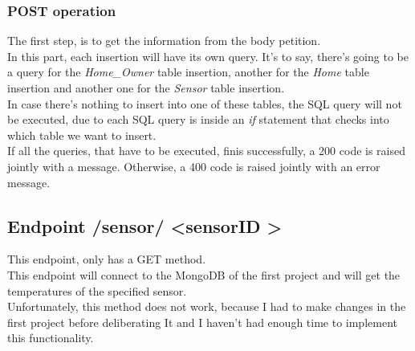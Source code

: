 \documentclass[a4paper,12pt]{article}
\begin{document}
\subsubsection*{POST operation}
The first step, is to get the information from the body petition.\\
In this part, each insertion will have its own query. It's to say, there's going to be a query for the \textit{Home\_Owner} table insertion, another for the \textit{Home} table insertion and another one for the \textit{Sensor} table insertion.\\
In case there's nothing to insert into one of these tables, the SQL query will not be executed, due to each SQL query is inside an \textit{if} statement that checks into which table we want to insert.\\
If all the queries, that have to be executed, finis successfully, a 200 code is raised jointly with a message. Otherwise, a 400 code is raised jointly with an error message.
\subsection*{Endpoint /sensor/ \textless sensorID \textgreater}
This endpoint, only has a GET method.\\
This endpoint will connect to the MongoDB of the first project and will get the temperatures of the specified sensor.\\
Unfortunately, this method does not work, because I had to make changes in the first project before deliberating It and I haven't had enough time to implement this functionality.
\newpage
\end{document}
